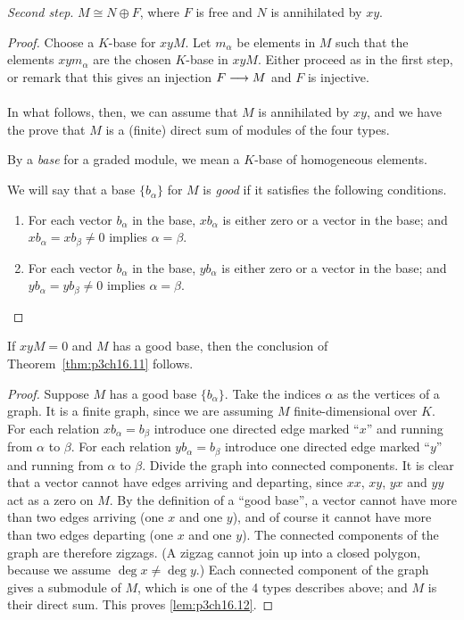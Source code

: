 \documentclass[../main]{subfiles}
\begin{document}
\emph{Second step}. $M \cong N \oplus F$, where $F$ is free and $N$ is annihilated by $xy$.

\begin{proof}
Choose a $K$-base for $x y M$. Let $m_\alpha$ be elements in $M$ such that the elements $x y m_\alpha$ are the chosen $K$-base in $x y M$. Either proceed as in the first step, or remark that this gives an injection $F \lar{} M$ and $F$ is injective.

In what follows, then, we can assume that $M$ is annihilated by $x y$, and we have the prove that $M$ is a (finite) direct sum of modules of the four types.

By a \emph{base}  for a graded module, we mean a $K$-base of homogeneous elements. 

We will say that a base $\{b_\alpha\}$ for $M$ is \emph{good} if it satisfies the following conditions. 

\begin{enumerate}
    \item[(i)] For each vector $b_\alpha$ in the base, $x b_\alpha$ is either zero or a vector in the base; and $x b_\alpha = x b_\beta \ne 0$ implies $\alpha = \beta$.
    \item[(ii)] For each vector $b_\alpha$ in the base, $y b_\alpha$ is either zero or a vector in the base; and $y b_\alpha = y b_\beta \ne 0$ implies $\alpha = \beta$. 
\end{enumerate}
\end{proof}

\begin{lemma}
\label{lem:p3ch16.12}
If $x y M = 0$ and $M$ has a good base, then the conclusion of Theorem~\ref{thm:p3ch16.11} follows. 
\end{lemma}

\begin{proof}
Suppose $M$ has a good base $\{b_\alpha\}$. Take the indices $\alpha$ as the vertices of a graph. It is a finite graph, since we are assuming $M$ finite-dimensional over $K$. For each relation $x b_\alpha = b_\beta$ introduce one directed edge marked ``$x$'' and running from $\alpha$ to $\beta$. For each relation $y b_\alpha = b_\beta$ introduce one directed edge marked ``$y$'' and running from $\alpha$ to $\beta$. Divide the graph into connected components. It is clear that a vector cannot have edges arriving and departing, since $x x$, $x y$, $y x$ and $y y$ act as a zero on $M$. By the definition of a ``good base'', a vector cannot have more than two edges arriving (one $x$ and one $y$), and of course it cannot have more than two edges departing (one $x$ and one $y$). The connected components of the graph are therefore zigzags. (A zigzag cannot join up into a closed polygon, because we assume $\deg x \ne \deg y$.) Each connected component of the graph gives a submodule of $M$, which is one of the 4 types describes above; and $M$ is their direct sum. This proves \ref{lem:p3ch16.12}.
\end{proof}
\end{document}
